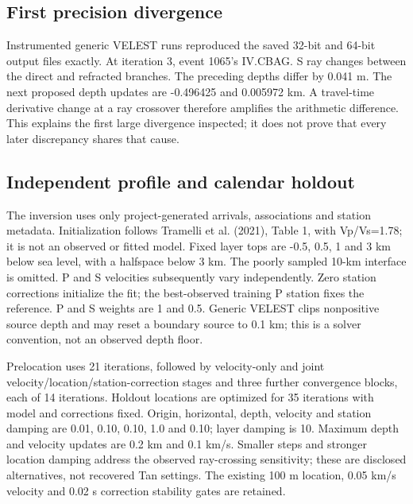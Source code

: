 \subsection*{First precision divergence}

Instrumented generic VELEST runs reproduced the saved 32-bit and 64-bit output files exactly. At iteration 3, event 1065's IV.CBAG. S ray changes between the direct and refracted branches. The preceding depths differ by 0.041 m. The next proposed depth updates are -0.496425 and 0.005972 km. A travel-time derivative change at a ray crossover therefore amplifies the arithmetic difference. This explains the first large divergence inspected; it does not prove that every later discrepancy shares that cause.

\par{\footnotesize{}}

\par{\footnotesize{}}

\par{\footnotesize{}}

\subsection*{Independent profile and calendar holdout}

The inversion uses only project-generated arrivals, associations and station metadata. Initialization follows Tramelli et al. (2021), Table 1, with Vp/Vs=1.78; it is not an observed or fitted model. Fixed layer tops are -0.5, 0.5, 1 and 3 km below sea level, with a halfspace below 3 km. The poorly sampled 10-km interface is omitted. P and S velocities subsequently vary independently. Zero station corrections initialize the fit; the best-observed training P station fixes the reference. P and S weights are 1 and 0.5. Generic VELEST clips nonpositive source depth and may reset a boundary source to 0.1 km; this is a solver convention, not an observed depth floor.

Prelocation uses 21 iterations, followed by velocity-only and joint velocity/location/station-correction stages and three further convergence blocks, each of 14 iterations. Holdout locations are optimized for 35 iterations with model and corrections fixed. Origin, horizontal, depth, velocity and station damping are 0.01, 0.10, 0.10, 1.0 and 0.10; layer damping is 10. Maximum depth and velocity updates are 0.2 km and 0.1 km/s. Smaller steps and stronger location damping address the observed ray-crossing sensitivity; these are disclosed alternatives, not recovered Tan settings. The existing 100 m location, 0.05 km/s velocity and 0.02 s correction stability gates are retained.

